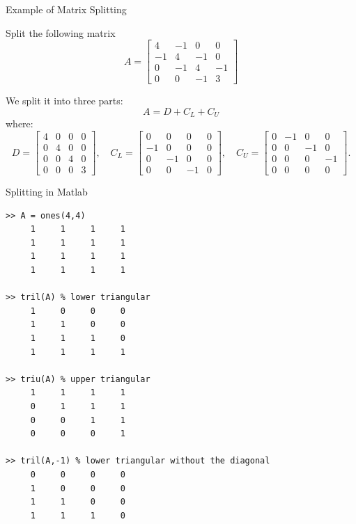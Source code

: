 \documentclass[10pt]{beamer}
\begin{document}
\begin{frame}{Example of Matrix Splitting}

\begin{example}
Split the following matrix
\[
A =
\begin{bmatrix}
4 & -1 & 0 & 0 \\
-1 & 4 & -1 & 0 \\
0 & -1 & 4 & -1 \\
0 & 0 & -1 & 3
\end{bmatrix}
\]
\end{example}
We split it into three parts:
\[
A = D + C_L + C_U
\]
where:
\[
D = \begin{bmatrix}
4 & 0 & 0 & 0 \\
0 & 4 & 0 & 0 \\
0 & 0 & 4 & 0 \\
0 & 0 & 0 & 3
\end{bmatrix}, \quad
C_L = \begin{bmatrix}
0 & 0 & 0 & 0 \\
-1 & 0 & 0 & 0 \\
0 & -1 & 0 & 0 \\
0 & 0 & -1 & 0
\end{bmatrix}, \quad
C_U = \begin{bmatrix}
0 & -1 & 0 & 0 \\
0 & 0 & -1 & 0 \\
0 & 0 & 0 & -1 \\
0 & 0 & 0 & 0
\end{bmatrix}.
\]
\end{frame}

\begin{frame}{Splitting in Matlab}

\begin{lstlisting}[mathescape]
>> A = ones(4,4)  
     1     1     1     1
     1     1     1     1
     1     1     1     1
     1     1     1     1

>> tril(A) % lower triangular 
     1     0     0     0
     1     1     0     0
     1     1     1     0
     1     1     1     1

>> triu(A) % upper triangular 
     1     1     1     1
     0     1     1     1
     0     0     1     1
     0     0     0     1

>> tril(A,-1) % lower triangular without the diagonal
     0     0     0     0
     1     0     0     0
     1     1     0     0
     1     1     1     0
\end{lstlisting}

\end{frame}
\end{document}
